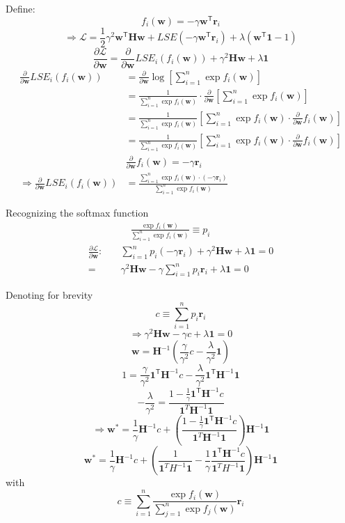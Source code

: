 Define:
$$f_i(\mathbf{w})=-\gamma\mathbf{w}^{\mathsf{T}}\mathbf{r}_i$$
$$\Longrightarrow \mathcal{L}=\frac{1}{2}\gamma^2\mathbf{w}^{\mathsf{T}}\mathbf{H}\mathbf{w}+LSE(-\gamma\mathbf{w}^{\mathsf{T}}\mathbf{r}_i)+\lambda(\mathbf{w^{\mathsf{T}}1}-1)$$
$$\frac{\partial\mathcal{L}}{\partial\mathbf{w}}=\frac{\partial}{\partial\mathbf{w}}LSE_i(f_i(\mathbf{w}))+\gamma^2\mathbf{H}\mathbf{w}+\lambda\mathbf{1}$$
\begin{align*}
\frac{\partial}{\partial\mathbf{w}}LSE_i(f_i(\mathbf{w}))&=\frac{\partial}{\partial\mathbf{w}}\log{\left[{\sum_{i=1}^{n}\exp f_i(\mathbf{w})}\right]} \\
&=\frac{1}{\sum_{i=1}^{n}\exp f_i(\mathbf{w})}\cdot\frac{\partial}{\partial\mathbf{w}}\left[{\sum_{i=1}^{n}\exp f_i(\mathbf{w})}\right] \\
&=\frac{1}{\sum_{i=1}^{n}\exp f_i(\mathbf{w})}\left[{\sum_{i=1}^{n}\exp f_i(\mathbf{w})}\cdot\frac{\partial}{\partial\mathbf{w}}f_i(\mathbf{w})\right] \\
&=\frac{1}{\sum_{i=1}^{n}\exp f_i(\mathbf{w})}\left[{\sum_{i=1}^{n}\exp f_i(\mathbf{w})}\cdot\frac{\partial}{\partial\mathbf{w}}f_i(\mathbf{w})\right] \\
&\frac{\partial}{\partial\mathbf{w}}f_i(\mathbf{w})=-\gamma\mathbf{r}_i \\
\Longrightarrow \frac{\partial}{\partial\mathbf{w}}LSE_i(f_i(\mathbf{w}))&=\frac{{\sum_{i=1}^{n}\exp f_i(\mathbf{w})}\cdot(-\gamma\mathbf{r}_i)}{\sum_{i=1}^{n}\exp f_i(\mathbf{w})}
\end{align*}

Recognizing the softmax function
\begin{align*}
  &\quad\frac{{\exp f_i(\mathbf{w})}}{\sum_{i=1}^{n}\exp f_i(\mathbf{w})}\equiv p_i \\
  \frac{\partial\mathcal{L}}{\partial\mathbf{w}}:\quad&\sum_{i=1}^{n}p_i(-\gamma\mathbf{r}_i)+\gamma^2\mathbf{H}\mathbf{w}+\lambda\mathbf{1}=0 \\
  =&\gamma^2\mathbf{H}\mathbf{w}-\gamma\sum_{i=1}^{n}p_i\mathbf{r}_i+\lambda\mathbf{1}=0
\end{align*}

Denoting for brevity
$$c\equiv\sum_{i=1}^{n}p_i\mathbf{r}_i$$
$$\Longrightarrow\gamma^{2}\mathbf{H}\mathbf{w}-\gamma c+\lambda\mathbf{1}=0$$
$$\mathbf{w}=\mathbf{H}^{-1}\left(\frac{\gamma}{\gamma^{2}}c-\frac{\lambda}{\gamma^{2}}\mathbf{1}\right)$$
$$1=\frac{\gamma}{\gamma^{2}}\mathbf{1}^{\mathsf{T}}\mathbf{H}^{-1}c-\frac{\lambda}{\gamma^{2}}\mathbf{1}^{\mathsf{T}}\mathbf{H}^{-1}\mathbf{1}$$
$$-\frac{\lambda}{\gamma^{2}}=\frac{1-\frac{1}{\gamma}\mathbf{1}^{\mathsf{T}}\mathbf{H}^{-1}c}{\mathbf1^T \mathbf{H}^{-1}\mathbf1}$$
$$\Longrightarrow\mathbf{w}^*=\frac{1}{\gamma}\mathbf{H}^{-1}c+\left(\frac{1-\frac{1}{\gamma}\mathbf{1}^{\mathsf{T}}\mathbf{H}^{-1}c}{\mathbf1^T \mathbf{H}^{-1}\mathbf1}\right)\mathbf{H}^{-1}\mathbf{1}$$
$$\boxed{\mathbf{w}^*=\frac{1}{\gamma}\mathbf{H}^{-1}c+\left(\frac{1}{\mathbf1^T H^{-1}\mathbf1}-\frac{1}{\gamma}\frac{\mathbf{1}^{\mathsf{T}}\mathbf{H}^{-1}c}{\mathbf1^T H^{-1}\mathbf1}\right)\mathbf{H}^{-1}\mathbf{1}}$$
with
$$c\equiv \sum_{i=1}^{n} \frac{\exp f_i(\mathbf{w})}{\sum_{j=1}^{n} \exp f_j(\mathbf{w})} \mathbf{r}_i$$

